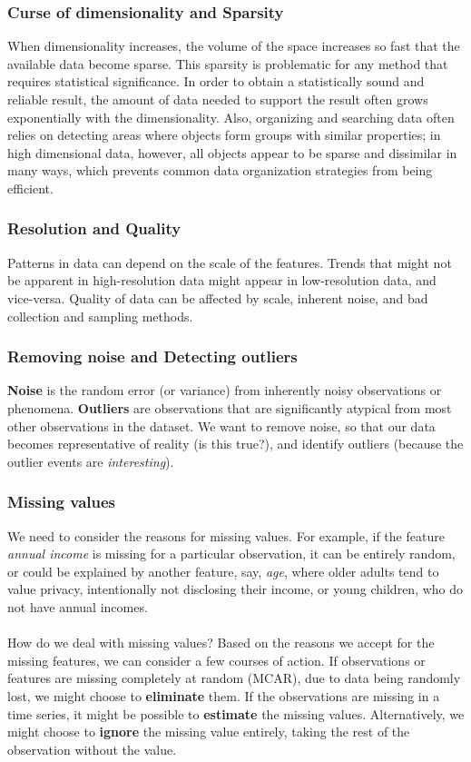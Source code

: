 \documentclass[9pt,twocolumn]{article}
\begin{document}
	\subsubsection*{Curse of dimensionality and Sparsity}
		When dimensionality increases, the volume of the space increases so fast that the available data become sparse. This sparsity is problematic for any method that requires statistical significance. In order to obtain a statistically sound and reliable result, the amount of data needed to support the result often grows exponentially with the dimensionality. Also, organizing and searching data often relies on detecting areas where objects form groups with similar properties; in high dimensional data, however, all objects appear to be sparse and dissimilar in many ways, which prevents common data organization strategies from being efficient.
	\subsubsection*{Resolution and Quality}
		Patterns in data can depend on the scale of the features. Trends that might not be apparent in high-resolution data might appear in low-resolution data, and vice-versa. Quality of data can be affected by scale, inherent noise, and bad collection and sampling methods.
	\subsubsection*{Removing noise and Detecting outliers}
		\textbf{Noise} is the random error (or variance) from inherently noisy observations or phenomena. \textbf{Outliers} are observations that are significantly atypical from most other observations in the dataset.  We want to remove noise, so that our data becomes representative of reality (is this true?), and identify outliers (because the outlier events are \textit{interesting}).
	\subsubsection*{Missing values}
		We need to consider the reasons for missing values. For example, if the feature \textit{annual income} is missing for a particular observation, it can be entirely random, or could be explained by another feature, say, \textit{age}, where older adults tend to value privacy, intentionally not disclosing their income, or young children, who do not have annual incomes.\\
		\\
		How do we deal with missing values? Based on the reasons we accept for the missing features, we can consider a few courses of action. If observations or features are missing completely at random (MCAR), due to data being randomly lost, we might choose to \textbf{eliminate} them. If the observations are missing in a time series, it might be possible to \textbf{estimate} the missing values. Alternatively, we might choose to \textbf{ignore} the missing value entirely, taking the rest of the observation without the value.
\end{document}
